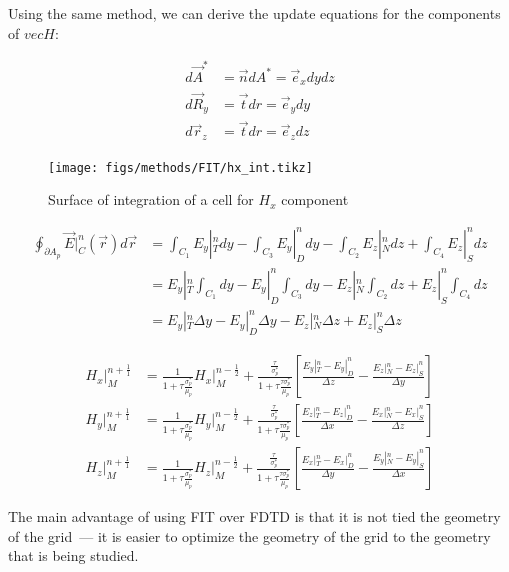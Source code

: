             Using the same method, we can derive the update equations for the components of $vec{H}$:

            \begin{align}
                d\vec{A}^* &= \vec{n}dA^* = \vec{e}_xdydz \\
                d\vec{R}_y &= \vec{t}dr = \vec{e}_ydy \\
                d\vec{r}_z &= \vec{t}dr = \vec{e}_zdz
            \end{align}

            \begin{figure}
                \centering
                \texttt{[image: figs/methods/FIT/hx\_int.tikz]}
                \caption{Surface of integration of a cell for $H_x$ component}
                \label{fig:Hx_Int}
            \end{figure}


            \begin{align}
                \oint_{\partial A_p} \vec{E}|_{C}^{n}(\vec{r})d\vec{r} &= \int_{C_1}E_y|_{T}^ndy
                        - \int_{C_3}E_y|_{D}^{n}dy - \int_{C_2}E_z|_{N}^{n}dz + \int_{C_4}E_z|_S^ndz \\
                        &= E_y|_T^n\int_{C_1}dy - E_y|_D^n\int_{C_3}dy - E_z|_N^n\int_{C_2}dz + E_z|_S^n\int_{C_4}dz\\
                        &= E_y|_T^n\Delta y - E_y|_D^n\Delta y - E_z|_N^n \Delta z + E_z|_S^n \Delta z
            \end{align}

            \begin{align}
                H_x|_M^{n+\frac{1}{1}} &= \frac{1}{1 + \tau\frac{\sigma_p^*}{\mu_p}}H_x|_M^{n-\frac{1}{2}} + \frac{\frac{\tau}{\sigma_p^*}}{1+\tau\frac{\tau\sigma_p^*}{\mu_p}}\left[ \frac{E_y|_T^n - E_y|_D^n}{\Delta z} - \frac{E_z|_N^n - E_z|_S^n}{\Delta y}\right]\\
                H_y|_M^{n+\frac{1}{1}} &= \frac{1}{1 + \tau\frac{\sigma_p^*}{\mu_p}}H_y|_M^{n-\frac{1}{2}} + \frac{\frac{\tau}{\sigma_p^*}}{1+\tau\frac{\tau\sigma_p^*}{\mu_p}}\left[\frac{E_z|_T^n - E_z|_D^n}{\Delta x} - \frac{E_x|_N^n - E_x|_S^n}{\Delta z}\right]\\
                H_z|_M^{n+\frac{1}{1}} &= \frac{1}{1 + \tau\frac{\sigma_p^*}{\mu_p}}H_z|_M^{n-\frac{1}{2}} + \frac{\frac{\tau}{\sigma_p^*}}{1+\tau\frac{\tau\sigma_p^*}{\mu_p}}\left[\frac{E_x|_T^n - E_x|_D^n}{\Delta y} - \frac{E_y|_N^n - E_y|_S^n}{\Delta x}\right]
            \end{align}

            The main advantage of using FIT over FDTD is that it is not tied the geometry of the grid~--- it is easier to optimize the geometry of the grid to the
            geometry that is being studied.

\clearpage
